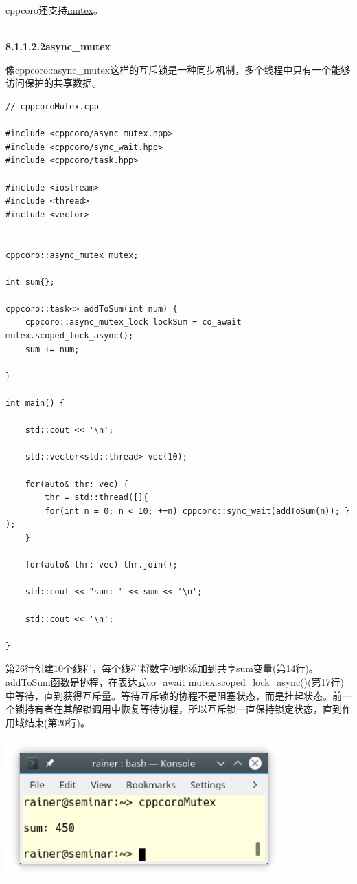 cppcoro还支持\href{https://en.cppreference.com/w/cpp/named_req/Mutex}{mutex}。

\hspace*{\fill} \\ %
\noindent
\textbf{8.1.1.2.2\hspace{0.2cm}async\_mutex}

像cppcoro::async\_mutex这样的互斥锁是一种同步机制，多个线程中只有一个能够访问保护的共享数据。

\begin{lstlisting}[style=styleCXX]
// cppcoroMutex.cpp

#include <cppcoro/async_mutex.hpp>
#include <cppcoro/sync_wait.hpp>
#include <cppcoro/task.hpp>

#include <iostream>
#include <thread>
#include <vector>


cppcoro::async_mutex mutex;

int sum{};

cppcoro::task<> addToSum(int num) {
	cppcoro::async_mutex_lock lockSum = co_await mutex.scoped_lock_async();
	sum += num;

}

int main() {

	std::cout << '\n';
	
	std::vector<std::thread> vec(10);
	
	for(auto& thr: vec) {
		thr = std::thread([]{
		for(int n = 0; n < 10; ++n) cppcoro::sync_wait(addToSum(n)); } );
	}
	
	for(auto& thr: vec) thr.join();
	
	std::cout << "sum: " << sum << '\n';
	
	std::cout << '\n';

}
\end{lstlisting}

第26行创建10个线程，每个线程将数字0到9添加到共享sum变量(第14行)。addToSum函数是协程，在表达式co\_await mutex.scoped\_lock\_async()(第17行)中等待，直到获得互斥量。等待互斥锁的协程不是阻塞状态，而是挂起状态。前一个锁持有者在其解锁调用中恢复等待协程，所以互斥锁一直保持锁定状态，直到作用域结束(第20行)。

\begin{center}
\includegraphics[width=0.8\textwidth]{content/5/chapter8/images/4.png}\\
\end{center}

